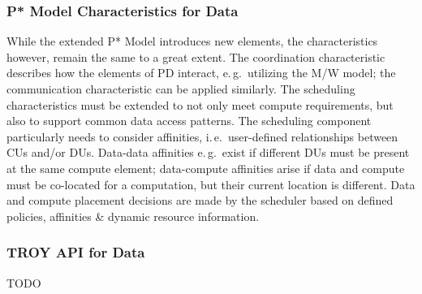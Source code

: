 \documentclass[conference,final]{IEEEtran}
\makeatletter
\def\reduwave{\bgroup \markoverwith{\lower3.5\p@\hbox{\sixly \textcolor{red}{\char58}}}\ULon}
\newcommand{\jwave}[1]{ {\reduwave{#1}}}
\newcommand{\jhanote}[1]{ {\textcolor{red} { ***shantenu: #1 }}}
\newcommand{\alnote}[1]{ {\textcolor{blue} { ***andre: #1 }}}
\newcommand{\jwave}[1]{#1}
\newcommand{\alnote}[1]{}
\newcommand{\jhanote}[1]{}
\newcommand{\cu}{CU}
\makeatother
\begin{document}


\subsubsection*{P* Model Characteristics for Data}

While the extended P* Model introduces new elements, the
characteristics however, remain the same to a great extent. The
coordination characteristic describes how the elements of PD interact,
e.\,g.\ utilizing the M/W model; the communication characteristic can
be applied similarly. The scheduling characteristics must be extended
to not only meet compute requirements, but also to support common data
access patterns. The scheduling component particularly needs to
consider affinities, i.\,e.\ user-defined relationships between \cu s
and/or DUs. Data-data affinities e.\,g.\ exist if different DUs must
be present at the same compute element; data-compute affinities arise
if data and compute must be co-located for a computation, but their
current location is different. Data and compute placement decisions are
made by the scheduler based on defined policies, affinities \& dynamic
resource information.

\subsubsection*{TROY API for Data}

TODO

% 
% 
\end{document}
